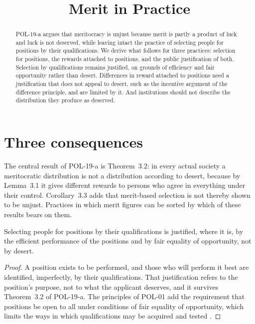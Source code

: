 \documentclass{situationist-preprint}
\title{Merit in Practice}
\begin{document}
\maketitle

\begin{abstract}
POL-19-a argues that meritocracy is unjust because merit is partly a product of luck and luck is not deserved, while leaving intact the practice of selecting people for positions by their qualifications. We derive what follows for three practices: selection for positions, the rewards attached to positions, and the public justification of both. Selection by qualifications remains justified, on grounds of efficiency and fair opportunity rather than desert. Differences in reward attached to positions need a justification that does not appeal to desert, such as the incentive argument of the difference principle, and are limited by it. And institutions should not describe the distribution they produce as deserved.
\end{abstract}

\section{Three consequences}

The central result of POL-19-a is Theorem~3.2: in every actual society a meritocratic distribution is not a distribution according to desert, because by Lemma~3.1 it gives different rewards to persons who agree in everything under their control. Corollary~3.3 adds that merit-based selection is not thereby shown to be unjust. Practices in which merit figures can be sorted by which of these results bears on them.

\begin{proposition}\label{p:selection}
Selecting people for positions by their qualifications is justified, where it is, by the efficient performance of the positions and by fair equality of opportunity, not by desert.
\end{proposition}

\begin{proof}
A position exists to be performed, and those who will perform it best are identified, imperfectly, by their qualifications. That justification refers to the position's purpose, not to what the applicant deserves, and it survives Theorem~3.2 of POL-19-a. The principles of POL-01 add the requirement that positions be open to all under conditions of fair equality of opportunity, which limits the ways in which qualifications may be acquired and tested \citep[\S14]{Rawls1971}.
\end{proof}
\end{document}
